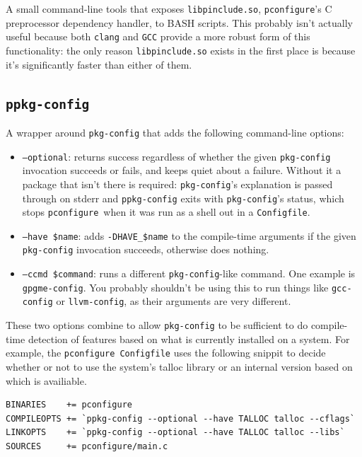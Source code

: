 \documentclass{article}
\newcommand{\pconfigure}{\texttt{pconfigure}}
\begin{document}
A small command-line tools that exposes \texttt{libpinclude.so},
\pconfigure's C preprocessor dependency handler, to BASH scripts.
This probably isn't actually useful because both \texttt{clang} and
\texttt{GCC} provide a more robust form of this functionality: the
only reason \texttt{libpinclude.so} exists in the first place is
because it's significantly faster than either of them.

\subsection{\texttt{ppkg-config} \label{prog:ppkg-config}}

A wrapper around \texttt{pkg-config} that adds the following
command-line options:

\begin{itemize}
\item \texttt{--optional}: returns success regardless of whether the
  given \texttt{pkg-config} invocation succeeds or fails, and keeps
  quiet about a failure.  Without it a package that isn't there is
  required: \texttt{pkg-config}'s explanation is passed through on
  stderr and \texttt{ppkg-config} exits with \texttt{pkg-config}'s
  status, which stops \pconfigure\ when it was run as a shell out in
  a \texttt{Configfile}.
\item \texttt{--have \$name}: adds \texttt{-DHAVE\_\$name} to the
  compile-time arguments if the given \texttt{pkg-config} invocation
  succeeds, otherwise does nothing.
\item \texttt{--ccmd \$command}: runs a different
  \texttt{pkg-config}-like command.  One example is
  \texttt{gpgme-config}.  You probably shouldn't be using this to run
  things like \texttt{gcc-config} or \texttt{llvm-config}, as their
  arguments are very different.
\end{itemize}

These two options combine to allow \texttt{pkg-config} to be
sufficient to do compile-time detection of features based on what is
currently installed on a system.  For example, the
\pconfigure\ \texttt{Configfile} uses the following snippit to decide
whether or not to use the system's talloc library or an internal
version based on which is availiable.

\begin{verbatim}
BINARIES    += pconfigure
COMPILEOPTS += `ppkg-config --optional --have TALLOC talloc --cflags`
LINKOPTS    += `ppkg-config --optional --have TALLOC talloc --libs`
SOURCES     += pconfigure/main.c
\end{verbatim}
\end{document}
